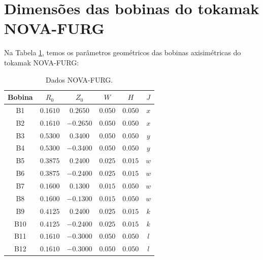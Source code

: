 \documentclass[12pt,oneside,a4paper]{abntex2}
\begin{document}
\section{Dimensões das bobinas do tokamak NOVA-FURG}
\noindent Na Tabela \ref{tab-nova}, temos os parâmetros geométricos das bobinas axisimétricas do tokamak NOVA-FURG: 
\begin{table}[h]
\begin{center}
    
	\begin{tabular}{|c | c | c | c  |c | c |}
		\hline
		 Bobina & $R_0$ & $Z_0$ & $W$ & $H$ & $J$ \\
		\hline
		 B1 & $0.1610$ & $0.2650$ & $0.050$ & $0.050$ & $ x $ \\
		 		\hline
		 B2 & $0.1610$ & $-0.2650$ & $0.050$ & $0.050$ & $ x $ \\
		 		\hline
		 B3 & $0.5300$ & $0.3400$ & $0.050$ & $0.050$ & $ y $ \\
		 		\hline
		 B4 & $0.5300$ & $-0.3400$ & $0.050$ & $0.050$ & $ y$ \\    
		 		\hline
         B5 & $0.3875$ & $0.2400$ & $0.025$ & $0.015$ & $w$ \\    
         		\hline
         B6 & $0.3875$ & $-0.2400$ & $0.025$ & $0.015$ & $w$ \\
         		\hline
         B7 & $0.1600$ & $0.1300$ & $0.015$ & $0.050$ & $ w $ \\     
         		\hline
         B8 & $0.1600$ & $-0.1300$ & $0.015$ & $0.050$ & $ w $ \\         
         		\hline
         B9 & $0.4125$ & $0.2400$ & $0.025$ & $0.015$ & $ k $ \\         
         		\hline
         B10 & $0.4125$ & $-0.2400$ & $0.025$ & $0.015$ & $ k $ \\         
         		\hline
         B11 & $0.1610$ & $-0.3000$ & $0.050$ & $0.050$ & $ l $ \\         
         		\hline
         B12 & $0.1610$ & $-0.3000$ & $0.050$ & $0.050$ & $ l $ \\         
         		\hline         		         		         	       		
	\end{tabular}
		\caption{Dados NOVA-FURG.}

\end{center}
	 \label{tab-nova}  
\end{table}
\end{document}
